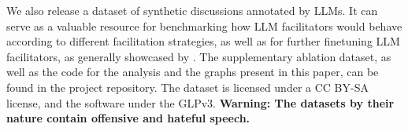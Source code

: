 %

We also release \vmd\datasetlink a dataset of synthetic discussions annotated by \acp{LLM}. It can serve as a valuable resource for benchmarking how \ac{LLM} facilitators would behave according to different facilitation strategies, as well as for further finetuning \ac{LLM} facilitators, as generally showcased by \citet{ulmer2024}. The supplementary ablation dataset, as well as the code for the analysis and the graphs present in this paper, can be found in the project repository\analysislink. The dataset is licensed under a CC BY-SA license, and the software under the \ac{GLP}v3. \textbf{Warning: The datasets by their nature contain offensive and hateful speech.}
